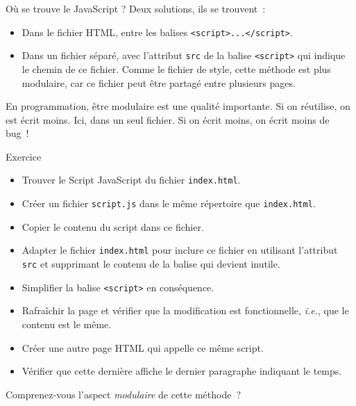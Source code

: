 \documentclass{beamer}
\begin{document}
    \begin{frame}{Où se trouve le JavaScript ?}
        Deux solutions, ils se trouvent~:
        \begin{itemize}
            \item Dans le fichier HTML, entre les balises \lstinline{<script>...</script>}.
            \item Dans un fichier séparé, avec l'attribut
            \lstinline{src} de la balise \lstinline{<script>} qui indique le chemin de ce
            fichier. Comme le fichier de style, cette méthode est plus modulaire, car ce
            fichier peut être partagé entre plusieurs pages.
        \end{itemize}
        \bigbreak
        \begin{dangercolorbox}
            En programmation, être modulaire est une qualité importante. Si on réutilise, on est écrit moins.
            Ici, dans un seul fichier.
            Si on écrit moins, on écrit moins de bug~!
        \end{dangercolorbox}
    \end{frame}

    \begin{frame}{Exercice \execcounterdispinc{}}
        \begin{itemize}
            \item Trouver le Script JavaScript du fichier \lstinline{index.html}.
            \item Créer un fichier
            \lstinline{script.js} dans le même répertoire que \lstinline{index.html}.
            \item Copier le contenu du script dans ce fichier.
            \item Adapter le fichier
            \lstinline{index.html} pour inclure ce fichier en utilisant l'attribut \lstinline{src}
            et supprimant le contenu de la balise qui devient inutile.
            \item Simplifier la balise \lstinline{<script>} en conséquence.
            \item Rafraîchir la page et vérifier que la modification est fonctionnelle,
            \textit{i.e.}, que le contenu est le même.
            \item Créer une autre page HTML qui appelle ce même script.
            \item Vérifier que cette dernière affiche le dernier paragraphe indiquant le temps.
        \end{itemize}
        Comprenez-vous l'aspect \textit{modulaire} de cette méthode~?
    \end{frame}
\end{document}
